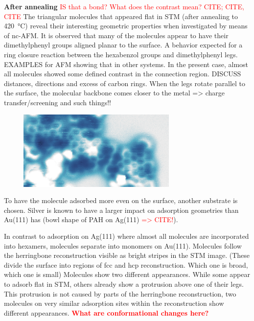 \textbf{After annealing} \textcolor{red}{IS that a bond? What does the contrast mean? CITE; CITE, CITE}
The triangular molecules that appeared flat in STM (after annealing to \SI{420}{\celsius}) reveal their interesting geometric properties when investigated by means of nc-AFM. It is observed that many of the molecules appear to have their dimethylphenyl groups aligned planar to the surface. A behavior expected for a ring closure reaction between the hexabenzol groups and dimethylphenyl legs. EXAMPLES for AFM showing that in other systems. In the present case, almost all molecules showed some defined contrast in the connection region. DISCUSS distances, directions and excess of carbon rings.
When the legs rotate parallel to the surface, the molecular backbone comes closer to the metal => charge transfer/screening and such things!!

\begin{figure}[] \centering
	\includegraphics[width=0.7\textwidth]{./images/hbbnc-annealed-afm}
	\caption{}
	\label{}
\end{figure}

To have the molecule adsorbed more even on the surface, another substrate is chosen. Silver is known to have a larger impact on adsorption geometries than Au(111) has (bowl shape of PAH on Ag(111) \textcolor{red}{=> CITE!}).

In contrast to adsorption on Ag(111) where almost all molecules are incorporated into hexamers, molecules separate into monomers on Au(111). Molecules follow the herringbone reconstruction visible as bright stripes in the STM image. 
(These divide the surface into regions of fcc and hcp reconstruction.
Which one is broad, which one is small)
Molecules show two different appearances. While some appear to adsorb flat in STM, others already show a protrusion above one of their legs. This protrusion is not caused by parts of the herringbone reconstruction, two molecules on very similar adsorption sites within the reconstruction show different appearances.
\textcolor{red}{\textbf{What are conformational changes here?}}

